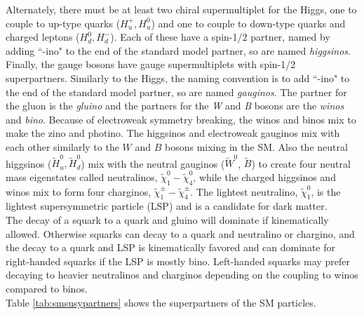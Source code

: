 Alternately, there must be at least two chiral supermultiplet for the Higgs, one to couple to up-type quarks ($H_u^+ , H_u^0$) and one to couple to down-type quarks and charged leptons ($H_d^0, H_d^-$).  Each of these have a spin-1/2 partner, named by adding ``-ino" to the end of the standard model partner, so are named \textit{higgsinos}.  \\

Finally, the gauge bosons  have gauge supermultiplets with spin-1/2 superpartners.  Similarly to the Higgs, the naming convention is to add ``-ino" to the end of the standard model partner, so are named \textit{gauginos}.  The partner for the gluon is the \textit{gluino} and the partners for the \textit{W} and \textit{B} bosons are the \textit{winos} and \textit{bino}.  Because of electroweak symmetry breaking, the winos and binos mix to make the zino and photino.  The higgsinos and electroweak gauginos mix with each other  similarly to the $W$ and $B$ bosons mixing in the SM.  Also the neutral higgsinos ($\widetilde{H}^0_u,\widetilde{H}^0_d$)  mix with the neutral gauginos ($\widetilde{W}^0$, $\widetilde{B}$) to create four neutral mass eigenstates called neutralinos, $\widetilde{\chi}^0_1-\widetilde{\chi}^0_4$, while the charged higgsinos and winos mix to form four charginos, $\widetilde{\chi}^\pm_1-\widetilde{\chi}^\pm_4$.  The lightest neutralino, $\widetilde{\chi}^0_1$, is the lightest supersymmetric particle (LSP) and is a candidate for dark matter.  \\

The decay of a squark to a quark and gluino will dominate if kinematically allowed.  Otherwise squarks can decay to a quark and neutralino or chargino, and the decay to a quark and LSP is kinematically favored and can dominate for right-handed squarks if the LSP is mostly bino.  Left-handed squarks may prefer decaying to heavier neutralinos and charginos depending on the coupling to winos compared to binos.  \\

Table \ref{tab:smsusypartners} shows the superpartners of the SM particles.  \\



